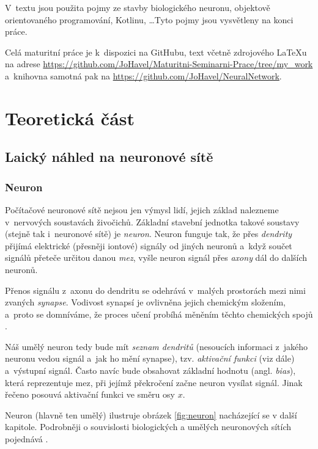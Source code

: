 \documentclass[12pt]{report}			%
\begin{document}
		V~textu jsou použita pojmy ze stavby biologického neuronu, objektově orientovaného programování, \gls{Kotlin}u, \ldots Tyto pojmy jsou vysvětleny na konci práce. 
		
		Celá maturitní práce je k~dispozici na GitHubu, text včetně zdrojového LaTeXu na adrese \url{https://github.com/JoHavel/Maturitni-Seminarni-Prace/tree/my\_work} a~knihovna samotná pak na \url{https://github.com/JoHavel/NeuralNetwork}.
	
	
	\part{Teoretická část}
		
			\chapter{Laický náhled na neuronové sítě}
			
				\section{Neuron}
					Počítačové neuronové sítě nejsou jen výmysl lidí, jejich základ nalezneme v~nervových soustavách živočichů. Základní stavební jednotka takové soustavy (stejně tak i~neuronové sítě) je \emph{neuron}. Neuron funguje tak, že přes \emph{\gls{dendrit}y} přijímá elektrické (přesněji iontové) signály od jiných neuronů a~když součet signálů přeteče určitou danou \emph{mez}, vyšle neuron signál přes \emph{\gls{axon}y} dál do dalších neuronů.
					
					Přenos signálu z~\gls{axon}u do \gls{dendrit}u se odehrává v~malých prostorách mezi nimi zvaných \emph{\gls{synapse}}. Vodivost synapsí je ovlivněna jejich chemickým složením, a~proto se domníváme, že proces učení probíhá měněním těchto chemických spojů \autocite[s. 491]{book:Informatika}.
					
					Náš umělý neuron tedy bude mít \emph{seznam \gls{dendrit}ů} (nesoucích informaci z~jakého neuronu vedou signál a~jak ho mění \gls{synapse}), tzv. \emph{aktivační funkci} (viz dále) a~výstupní signál. Často navíc bude obsahovat základní hodnotu (angl. \emph{bias}), která reprezentuje mez, při jejímž překročení začne neuron vysílat signál. Jinak řečeno posouvá aktivační funkci ve směru osy $x$.
					
					Neuron (hlavně ten umělý) ilustruje obrázek \ref{fig:neuron} nacházející se v další kapitole. Podrobněji o souvislosti biologických a umělých neuronových sítích pojednává \autocite{book:BNN}.
				
\end{document}
